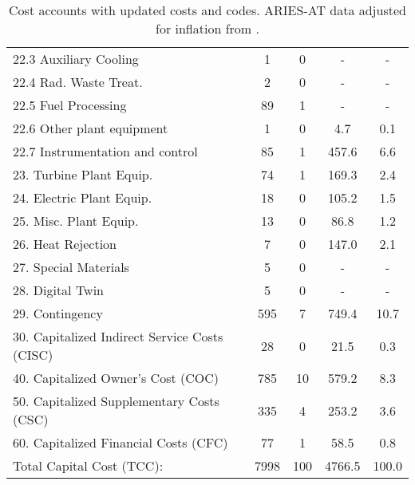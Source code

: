 \begin{table}[h!]
{\begin{tabular}{lcccc}
\hspace{10mm}22.3 Auxiliary Cooling & 1 & 0 & - & - \\
\hspace{10mm}22.4 Rad. Waste Treat. & 2 & 0 & - & - \\
\hspace{10mm}22.5 Fuel Processing & 89 & 1 & - & - \\
\hspace{10mm}22.6 Other plant equipment & 1 & 0 & 4.7 & 0.1 \\
\hspace{10mm}22.7 Instrumentation and control & 85 & 1 & 457.6 & 6.6 \\
\hspace{5mm}23. Turbine Plant Equip. & 74 & 1 & 169.3 & 2.4 \\
\hspace{5mm}24. Electric Plant Equip. & 18 & 0 & 105.2 & 1.5 \\
\hspace{5mm}25. Misc. Plant Equip. & 13 & 0 & 86.8 & 1.2 \\
\hspace{5mm}26. Heat Rejection & 7 & 0 & 147.0 & 2.1 \\
\hspace{5mm}27. Special Materials & 5 & 0 & - & - \\
\hspace{5mm}28. Digital Twin & 5 & 0 & - & - \\
\hspace{5mm}29. Contingency & 595 & 7 & 749.4 & 10.7 \\
30. Capitalized Indirect Service Costs (CISC) & 28 & 0 & 21.5 & 0.3 \\
40. Capitalized Owner’s Cost (COC) & 785 & 10 & 579.2 & 8.3 \\
50. Capitalized Supplementary Costs (CSC) & 335 & 4 & 253.2 & 3.6 \\
60. Capitalized Financial Costs (CFC) & 77 & 1 & 58.5 & 0.8 \\
\hline
Total Capital Cost (TCC): & 7998 & 100 & 4766.5 & 100.0 \\
\hline
\end{tabular}
}
\caption{Cost accounts with updated costs and codes. ARIES-AT data adjusted for inflation from \cite{gordon1986mirror}.}
\label{tab:costs_updated_codes}
\end{table}


